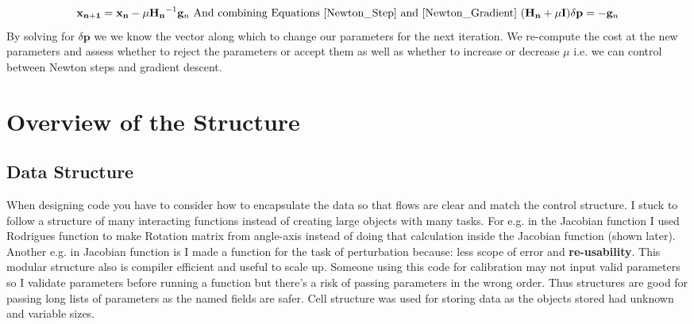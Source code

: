 \documentclass[titlepage]{article}
\begin{document}
\begin{equation}
\label{Newton_Gradient}
\mathbf{x_{n+1}}=\mathbf{x_n}-\mu\mathbf{H_n}^{-1} \mathbf{g}_n   
\text{ And combining Equations \ref{Newton_Step} and \ref{Newton_Gradient} } (\mathbf{H_n}+\mu\mathbf{I})\delta \mathbf{p}= -\mathbf{g}_n
\end{equation}
By solving for $\delta\mathbf{p}$ we we know the vector along which to change our parameters for the next iteration. We re-compute the cost at the new parameters and assess whether to reject the parameters or accept them as well as whether to increase or decrease $\mu$ i.e. we can control between Newton steps and gradient descent.
\section{Overview of the Structure}
\subsection{Data Structure}
When designing code you have to consider how to encapsulate the data so that flows are clear and match the control structure. I stuck to follow a structure of many interacting functions instead of creating large objects with many tasks. For e.g. in the Jacobian function I used Rodrigues function to make Rotation matrix from angle-axis instead of doing that calculation inside the Jacobian function (shown later).
Another e.g. in Jacobian function is I made a function for the task of perturbation because: less scope of error and \textbf{re-usability}. This modular structure also is compiler efficient and useful to scale up. Someone using this code for calibration may not input valid parameters so I validate parameters before running a function but there's a risk of passing parameters in the wrong order. Thus structures are good for passing long lists of parameters as the named fields are safer. Cell structure was used for storing data as the objects stored had unknown and variable sizes.
\end{document}
